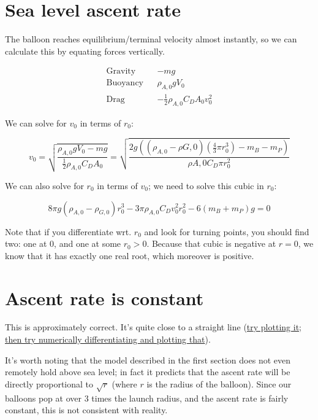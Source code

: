 \documentclass{article}
\begin{document}
\section{Sea level ascent rate}

The balloon reaches equilibrium/terminal velocity almost instantly,
so we can calculate this by equating forces vertically.

\begin{align*}
    \text{Gravity} && -mg \\
    \text{Buoyancy} && \rho_{A,0} g V_0 \\
    \text{Drag} && -\frac{1}{2} \rho_{A,0} C_D A_0 v_0^2
\end{align*}

We can solve for $v_0$ in terms of $r_0$:

\[
    v_0
    = \sqrt{
        \frac{ \rho_{A,0}gV_0 - mg }%
             { \frac{1}{2} \rho_{A,0} C_D A_0 }
        }
%
    = \sqrt{
        \frac{ 2g ((\rho_{A,0} - \rho{G,0}) (\frac{4}{3} \pi r_0^3) - m_B - m_P) }%
             { \rho{A,0} C_D \pi r_0^2 }
        }
\]

We can also solve for $r_0$ in terms of $v_0$; we need to solve this cubic in $r_0$:

\[
       8 \pi g (\rho_{A,0} - \rho_{G,0}) r_0^3
     - 3 \pi \rho_{A,0} C_D v_0^2 r_0 ^2
     - 6 (m_B + m_P) g
      = 0
\]

Note that if you differentiate wrt. $r_0$ and look for turning points, you should find two:
one at $0$, and one at some $r_0 > 0$. Because that cubic is negative at $r = 0$, we know
that it has exactly one real root, which moreover is positive.

\section{Ascent rate is constant}

This is approximately correct. It's quite close to a straight line
(\href{http://nbviewer.ipython.org/github/danielrichman/burst-calc-notes/blob/master/actual-data.ipynb}{try plotting it; then try numerically differentiating and plotting that}).

It's worth noting that the model described in the first section does not even remotely hold
above sea level; in fact it predicts that the ascent rate will be directly proportional
to $\sqrt{r}$ (where $r$ is the radius of the balloon). Since our balloons pop at over
$3$ times the launch radius, and the ascent rate is fairly constant,
this is not consistent with reality.
\end{document}
